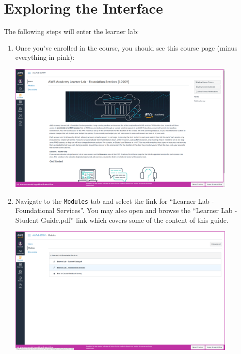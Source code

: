 \documentclass{csse4400}
\begin{document}
\section{Exploring the Interface}

The following steps will enter the learner lab:

\begin{enumerate}

\item Once you've enrolled in the course, you should see this course page (minus everything in pink):

\includegraphics[width=0.9\textwidth]{images/academy-homepage}

\item Navigate to the \texttt{Modules} tab and select the link for ``Learner Lab - Foundational Services''.
      You may also open and browse the ``Learner Lab - Student Guide.pdf'' link which covers some of the content of this guide.

\includegraphics[width=0.9\textwidth]{images/modules-page}


\end{enumerate}
\end{document}
